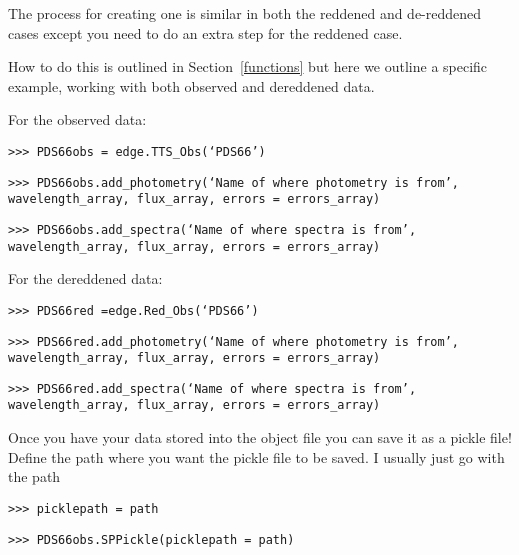 \documentclass{article}
\begin{document}
The process for creating one is similar in both the reddened and de-reddened cases except you need to do an extra step for the reddened case. 

How to do this is outlined in Section~\ref{functions} but here we outline a specific example, working with both observed and dereddened data.

For the observed data:

\vspace{2mm}
\texttt{>>> PDS66obs = edge.TTS\_Obs(`PDS66')}
\vspace{2mm}

\vspace{2mm}
\texttt{>>> PDS66obs.add\_photometry(`Name of where photometry is from',}\\
\texttt{wavelength\_array, flux\_array, errors = errors\_array)}
\vspace{2mm}

\vspace{2mm}
\texttt{>>> PDS66obs.add\_spectra(`Name of where spectra is from',}\\
\texttt{wavelength\_array, flux\_array, errors = errors\_array)}
\vspace{2mm}

For the dereddened data:

\vspace{2mm}
\texttt{>>> PDS66red =edge.Red\_Obs(`PDS66')}
\vspace{2mm}

\vspace{2mm}
\texttt{>>> PDS66red.add\_photometry(`Name of where photometry is from',}\\
\texttt{wavelength\_array, flux\_array, errors = errors\_array)}	
\vspace{2mm}

\vspace{2mm}
\texttt{>>> PDS66red.add\_spectra(`Name of where spectra is from',}\\
\texttt{wavelength\_array, flux\_array, errors = errors\_array)}	
\vspace{2mm}

Once you have your data stored into the object file you can save it as a pickle file!  Define the path where you want the pickle file to be saved. I usually just go with the path

\vspace{2mm}
\texttt{>>> picklepath = path}
\vspace{2mm}

\vspace{2mm}
\texttt{>>> PDS66obs.SPPickle(picklepath = path)}
\vspace{2mm}
\end{document}
